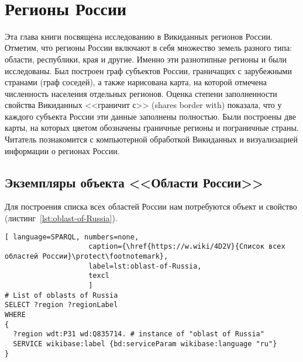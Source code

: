 ﻿﻿\chapter{Регионы России}
\label{ch:oblast-of-Russia}
Эта глава книги посвящена исследованию в Викиданных регионов России. 
Отметим, что регионы России включают в себя множество земель разного 
типа: области, республики, края и другие. Именно эти разнотипные регионы 
и были исследованы. Был построен граф субъектов России, граничащих 
с зарубежными странами (граф соседей), а также нарисована карта, 
на которой отмечена численность населения отдельных регионов. Оценка 
степени заполненности свойства Викиданных <<граничит с>> (shares border with) 
показала, что у каждого субъекта России эти данные заполнены полностью. Были построены две карты, на которых цветом обозначены граничные регионы и пограничные страны.
Читатель познакомится с компьютерной обработкой Викиданных и визуализацией 
информации о регионах России.

\label{question:q_subjects_of_Russia_3}

\section{Экземпляры объекта <<Области России>>}

Для построения списка всех областей России нам потребуются объект 
 и свойство  
(листинг~\ref{lst:oblast-of-Russia}).

\begin{lstlisting}[ language=SPARQL, numbers=none,
                    caption={\href{https://w.wiki/4D2V}{Список всех областей России}\protect\footnotemark},
                    label=lst:oblast-of-Russia,
                    texcl 
                    ]
# List of oblasts of Russia
SELECT ?region ?regionLabel
WHERE
{
  ?region wdt:P31 wd:Q835714. # instance of "oblast of Russia"
  SERVICE wikibase:label {bd:serviceParam wikibase:language "ru"}
}
\end{lstlisting}%

